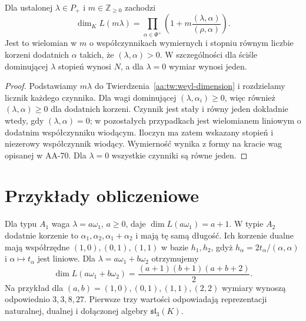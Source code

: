 \begin{wniosek}
\label{aa:cor:weyl-dimension-polynomial}
Dla ustalonej $\lambda\in P_+$ i $m\in\mathbb Z_{\ge0}$ zachodzi
\[
 \dim_K L(m\lambda)=
 \prod_{\alpha\in\Phi^+}
 \left(1+m\frac{(\lambda,\alpha)}{(\rho,\alpha)}\right).
\]
Jest to wielomian w $m$ o współczynnikach wymiernych i stopniu równym liczbie korzeni dodatnich $\alpha$ takich, że $(\lambda,\alpha)>0$. W szczególności dla ściśle dominującej $\lambda$ stopień wynosi $N$, a dla $\lambda=0$ wymiar wynosi jeden.
\end{wniosek}
\begin{proof}
Podstawiamy $m\lambda$ do Twierdzenia~\ref{aa:tw:weyl-dimension} i rozdzielamy licznik każdego czynnika. Dla wagi dominującej $(\lambda,\alpha_i)\ge0$, więc również $(\lambda,\alpha)\ge0$ dla dodatnich korzeni. Czynnik jest stały i równy jeden dokładnie wtedy, gdy $(\lambda,\alpha)=0$; w pozostałych przypadkach jest wielomianem liniowym o dodatnim współczynniku wiodącym. Iloczyn ma zatem wskazany stopień i niezerowy współczynnik wiodący. Wymierność wynika z formy na kracie wag opisanej w AA-70. Dla $\lambda=0$ wszystkie czynniki są równe jeden.
\end{proof}

\section{Przykłady obliczeniowe}

\begin{przyklad}[Typy $A_1$ i $A_2$]
\label{aa:prz:weyl-dimension-a}
Dla typu $A_1$ waga $\lambda=a\omega_1$, $a\ge0$, daje $\dim L(a\omega_1)=a+1$. W typie $A_2$ dodatnie korzenie to $\alpha_1,\alpha_2,\alpha_1+\alpha_2$ i mają tę samą długość. Ich korzenie dualne mają współrzędne $(1,0),(0,1),(1,1)$ w bazie $h_1,h_2$, gdyż $h_\alpha=2t_\alpha/(\alpha,\alpha)$ i $\alpha\mapsto t_\alpha$ jest liniowe. Dla $\lambda=a\omega_1+b\omega_2$ otrzymujemy
\[
 \dim L(a\omega_1+b\omega_2)=
 \frac{(a+1)(b+1)(a+b+2)}{2}.
\]
Na przykład dla $(a,b)=(1,0),(0,1),(1,1),(2,2)$ wymiary wynoszą odpowiednio $3,3,8,27$. Pierwsze trzy wartości odpowiadają reprezentacji naturalnej, dualnej i dołączonej algebry $\mathfrak{sl}_3(K)$.
\end{przyklad}

